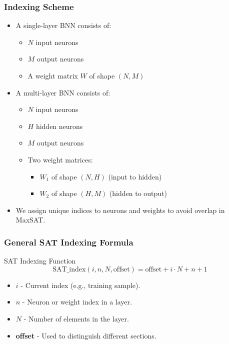 \documentclass[12pt]{beamer}
\begin{document}
\begin{frame}
\frametitle{Indexing Scheme}
\begin{itemize}
    \item A single-layer BNN consists of:
    \begin{itemize}
        \item \( N \) input neurons
        \item \( M \) output neurons
        \item A weight matrix \( W \) of shape \( (N, M) \)
    \end{itemize}
    \item A multi-layer BNN consists of:
    \begin{itemize}
        \item \( N \) input neurons
        \item \( H \) hidden neurons
        \item \( M \) output neurons
        \item Two weight matrices:
        \begin{itemize}
            \item \( W_1 \) of shape \( (N, H) \) (input to hidden)
            \item \( W_2 \) of shape \( (H, M) \) (hidden to output)
        \end{itemize}
    \end{itemize}
    \item We assign unique indices to neurons and weights to avoid overlap in MaxSAT.
\end{itemize}
\end{frame}

\begin{frame}
\frametitle{General SAT Indexing Formula}
\begin{block}{SAT Indexing Function}
\begin{equation*}
    \text{SAT\_index}(i, n, N, \text{offset}) = \text{offset} + i \cdot N + n + 1
\end{equation*}
\end{block}
\begin{itemize}
    \item \( i \) - Current index (e.g., training sample).
    \item \( n \) - Neuron or weight index in a layer.
    \item \( N \) - Number of elements in the layer.
    \item \textbf{offset} - Used to distinguish different sections.
\end{itemize}
\end{frame}
\end{document}
